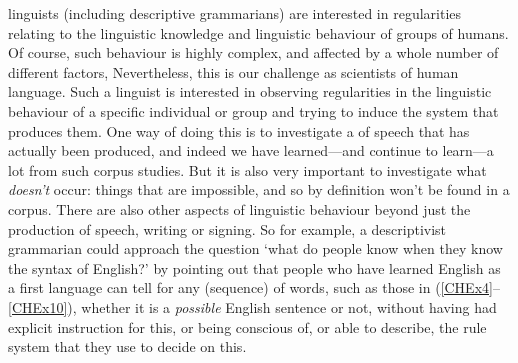 \documentclass{article}
\begin{document}
 linguists (including descriptive grammarians) are interested in regularities relating to the linguistic knowledge and linguistic behaviour of groups of humans. 
Of course, such behaviour is highly complex, and affected by a whole number of different factors, 
Nevertheless, this is our challenge as scientists of human language.
Such a linguist is interested in observing regularities in the linguistic behaviour of a specific individual or group and trying to induce the system that produces them.
One way of doing this is to investigate a  of speech that has actually been produced, and indeed we have learned---and continue to learn---a lot from such corpus studies.
But it is also very important to investigate what \emph{doesn’t} occur: things that are impossible, and so by definition won't be found in a corpus.
There are also other aspects of linguistic behaviour beyond just the production of speech, writing or signing.
So for example, a descriptivist grammarian could approach the question `what do people know when they know the syntax of English?' by pointing out that people who have learned English as a first language can tell for any  (sequence) of words, such as those in (\ref{CHEx4}--\ref{CHEx10}), whether it is a \emph{possible} English sentence or not, without having had explicit instruction for this, or being conscious of, or able to describe, the rule system that they use to decide on this. 
\end{document}
